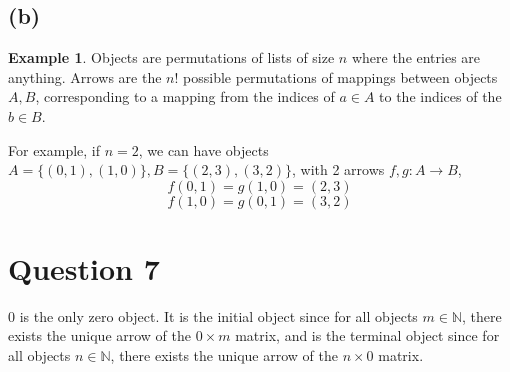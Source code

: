 \documentclass[11pt]{article} %
\theoremstyle{definition}
\newtheorem{example}[theorem]{Example}
\begin{document}
\subsection*{(b)}
\begin{example}
    
Objects are permutations of lists of size $n$ where the entries are anything.
Arrows are the $n!$ possible permutations of mappings between objects $A,B$, 
corresponding to a mapping from the indices of $a\in A$ to the indices of the $b\in B$.

For example, if $n=2$, we can have objects $A=\{(0,1),(1,0)\},B=\{(2,3),(3,2)\}$,
with 2 arrows $f,g:A\rightarrow B$, 
\[f(0,1)=g(1,0)=(2,3)\]
\[f(1,0)=g(0,1)=(3,2)\]
\end{example}

\section*{Question 7}
\addtocounter{section}{1}
0 is the only zero object. 
It is the initial object since for all objects $m\in\mathbb{N}$,
there exists the unique arrow of the $0\times m$ matrix,
and is the terminal object since for all objects $n\in\mathbb{N}$,
there exists the unique arrow of the $n\times 0$ matrix.
\end{document}
